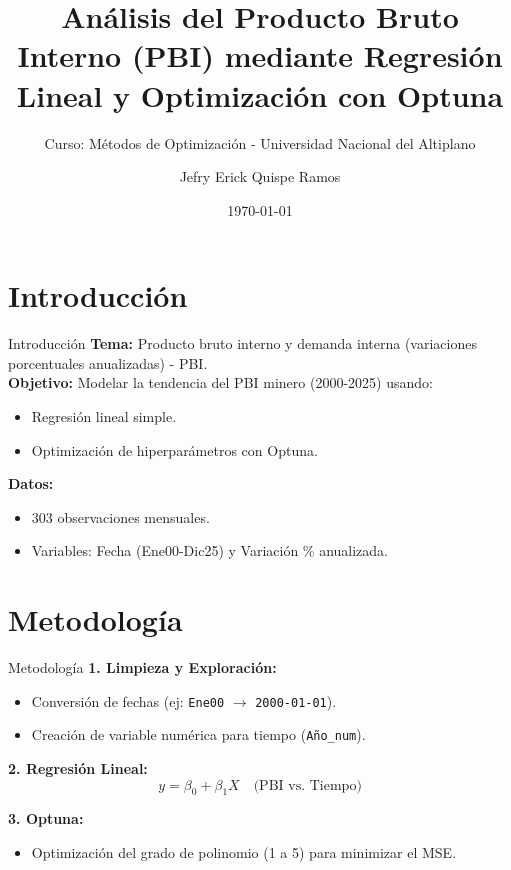 \documentclass[12pt]{beamer}
\title[Métodos de Optimización]{Análisis del Producto Bruto Interno (PBI) mediante Regresión Lineal y Optimización con Optuna}
\subtitle{Curso: Métodos de Optimización - Universidad Nacional del Altiplano}
\author[Jefry Erick Quispe Ramos]{Jefry Erick Quispe Ramos}
\date{\today}
\begin{document}
\begin{frame}
    \titlepage
\end{frame}

\section{Introducción}
\begin{frame}{Introducción}
    \textbf{Tema:} Producto bruto interno y demanda interna (variaciones porcentuales anualizadas) - PBI.\\
    \textbf{Objetivo:} Modelar la tendencia del PBI minero (2000-2025) usando:
    \begin{itemize}
        \item Regresión lineal simple.
        \item Optimización de hiperparámetros con Optuna.
    \end{itemize}
    \textbf{Datos:}
    \begin{itemize}
        \item 303 observaciones mensuales.
        \item Variables: Fecha (Ene00-Dic25) y Variación \% anualizada.
    \end{itemize}
\end{frame}

\section{Metodología}
\begin{frame}{Metodología}
    \textbf{1. Limpieza y Exploración:}
    \begin{itemize}
        \item Conversión de fechas (ej: \texttt{Ene00} $\rightarrow$ \texttt{2000-01-01}).
        \item Creación de variable numérica para tiempo (\texttt{Año\_num}).
    \end{itemize}
    
    \textbf{2. Regresión Lineal:}
    \begin{equation*}
        y = \beta_0 + \beta_1 X \quad \text{(PBI vs. Tiempo)}
    \end{equation*}
    
    \textbf{3. Optuna:}
    \begin{itemize}
        \item Optimización del grado de polinomio (1 a 5) para minimizar el MSE.
    \end{itemize}
\end{frame}
\end{document}
